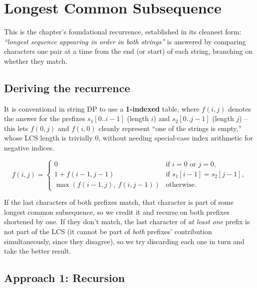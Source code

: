 \section{Longest Common Subsequence}
\label{sec:dp-lcs}


\begin{patternbox}
This is the chapter's foundational recurrence, established in its
cleanest form: \emph{``longest sequence appearing in order in both
strings''} is answered by comparing characters one pair at a time from
the end (or start) of each string, branching on whether they match.
\end{patternbox}

\subsection*{Deriving the recurrence}

It is conventional in string DP to use a \textbf{1-indexed} table, where
$f(i,j)$ denotes the answer for the prefixes $s_1[0..i-1]$ (length $i$)
and $s_2[0..j-1]$ (length $j$) -- this lets $f(0,j)$ and $f(i,0)$ cleanly
represent ``one of the strings is empty,'' whose LCS length is trivially
$0$, without needing special-case index arithmetic for negative indices.

\[
  f(i,j) =
  \begin{cases}
    0 & \text{if } i=0 \text{ or } j=0, \\
    1 + f(i{-}1,j{-}1) & \text{if } s_1[i{-}1] = s_2[j{-}1], \\
    \max(f(i{-}1,j),\ f(i,j{-}1)) & \text{otherwise.}
  \end{cases}
\]

If the last characters of both prefixes match, that character is part of
some longest common subsequence, so we credit it and recurse on both
prefixes shortened by one. If they don't match, the last character of
\emph{at least one} prefix is not part of the LCS (it cannot be part of
\emph{both} prefixes' contribution simultaneously, since they disagree),
so we try discarding each one in turn and take the better result.

\subsection*{Approach 1: Recursion}

